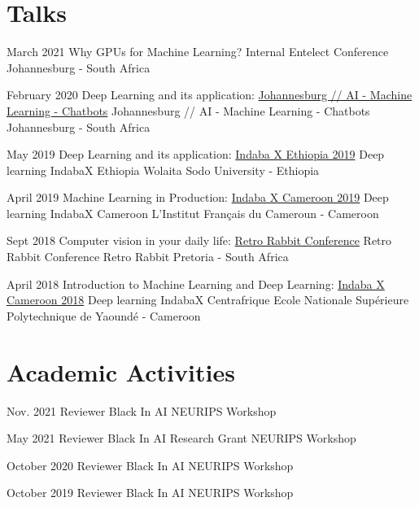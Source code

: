 \documentclass[letterpaper]{moderncv}        %
\begin{document}
\vspace{1mm}


\section{Talks}

\cventry
{March 2021}
{Why GPUs for Machine Learning?}
{Internal Entelect Conference}
{Johannesburg - South Africa}
{}
{}

\cventry
{February 2020}
{Deep Learning and its application: \href{https://www.meetup.com/Johannesburg-Artificial-Intelligence-Meetup/events/268234198/}{Johannesburg // AI - Machine Learning - Chatbots}}
{Johannesburg // AI - Machine Learning - Chatbots}
{Johannesburg - South Africa}
{}
{}


\cventry
{May 2019}
{Deep Learning and its application: \href{https://sites.google.com/view/indabaxethiopia2019/speakers?authuser=0}{Indaba X Ethiopia 2019}}
{Deep learning IndabaX Ethiopia}
{Wolaita Sodo University - Ethiopia}
{}
{}

\cventry
{April 2019}
{Machine Learning in Production:    \href{https://indabaxcameroon.github.io}{Indaba X Cameroon 2019}}
{Deep learning IndabaX Cameroon}
{L'Institut Français du Cameroun - Cameroon}
{}
{}


\cventry
{Sept 2018}
{Computer vision in your daily life: \href{https://www.youtube.com/watch?v=0Z--tiJ3FyE}
	{Retro Rabbit Conference}}
{Retro Rabbit Conference}
{Retro Rabbit Pretoria - South Africa}
{}
{}

\cventry
{April 2018}
{Introduction to Machine Learning and Deep Learning: \href{http://www.deeplearningindaba.com/indabax-centrafrique.html}{Indaba X Cameroon 2018}}
{Deep learning IndabaX Centrafrique}
{Ecole Nationale Supérieure Polytechnique de Yaoundé - Cameroon}
{}
{}
	
\vspace{9mm}	

\section{Academic Activities}	

\cventry
{Nov. 2021}
{Reviewer Black In AI}
{NEURIPS Workshop}
{}
{}
{}

\cventry
{May 2021}
{Reviewer Black In AI Research Grant}
{NEURIPS Workshop}
{}
{}
{}

\cventry
{October 2020}
{Reviewer Black In AI}
{NEURIPS Workshop}
{}
{}
{}

\cventry
{October 2019}
{Reviewer Black In AI}
{NEURIPS Workshop}
{}
{}
{}
\end{document}
